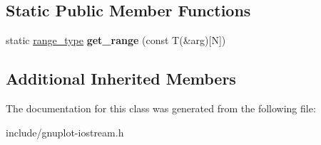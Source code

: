 \subsection*{Static Public Member Functions}
\begin{DoxyCompactItemize}
\item 
\mbox{\label{classgnuplotio_1_1ArrayTraits_3_01T[N]_4_adc9c1ce6da4923418f367e08c150a928}} 
static \hyperlink{classgnuplotio_1_1IteratorRange}{range\+\_\+type} {\bfseries get\+\_\+range} (const T(\&arg)\mbox{[}N\mbox{]})
\end{DoxyCompactItemize}
\subsection*{Additional Inherited Members}


The documentation for this class was generated from the following file\+:\begin{DoxyCompactItemize}
\item 
include/gnuplot-\/iostream.\+h\end{DoxyCompactItemize}
